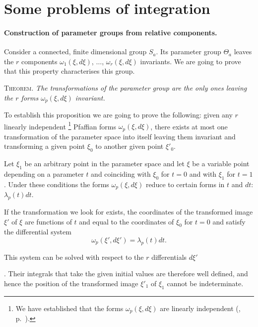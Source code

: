\section{Some problems of integration}
\label{sec:some-probl-integr}

\paragraph{Construction of parameter groups from relative components.}
\label{sec:83}
Consider a connected, finite dimensional group $S_{a}$. Its parameter group $\Theta_{a}$ leaves the $r$ components $\omega_{1}(\xi,d\xi)$, $\dots$, $\omega_{r}(\xi,d\xi)$ invariants. We are going to prove that this property characterises this group.

\somespace

\textsc{Theorem.} \emph{The transformations of the parameter group are the only ones leaving the $r$ forms $\omega_{p}(\xi,d\xi)$ invariant.}

\somespace

To establish this proposition we are going to prove the following: given any $r$ linearly independent \footnote{We have established that the forms $\omega_{p}(\xi,d\xi)$ are linearly independent (, p.~\pageref{sec:71}).} Pfaffian forms $\omega_{p}(\xi,d\xi)$, there exists at most one transformation of the parameter space into itself leaving them invariant and transforming a given point $\xi_{0}$ to another given point $\xi'_{0}$.

Let $\xi_{1}$ be an arbitrary point in the parameter space and let $\xi$ be a variable point depending on a parameter $t$ and coinciding with $\xi_{0}$ for $t=0$ and with $\xi_{1}$ for $t=1$. Under these conditions the forms $\omega_{p}(\xi,d\xi)$ reduce to certain forms in $t$ and $dt$: $\lambda_{p}(t)dt$.

If the transformation we look for exists, the coordinates of the transformed image $\xi'$ of $\xi$ are functions of $t$ and equal to the coordinates of $\xi_{0}$ for $t=0$ and satisfy the differential system
\[
\omega_{p}(\xi',d\xi')=\lambda_{p}(t)dt.
\]

This system can be solved with respect to the $r$ differentials $d\xi'$ \addtocounter{footnote}{-1}\footnotemark. Their integrals that take the given initial values are therefore well defined, and hence the position of the transformed image $\xi'_{1}$ of $\xi_{1}$ cannot be indeterminate.

\somespace

